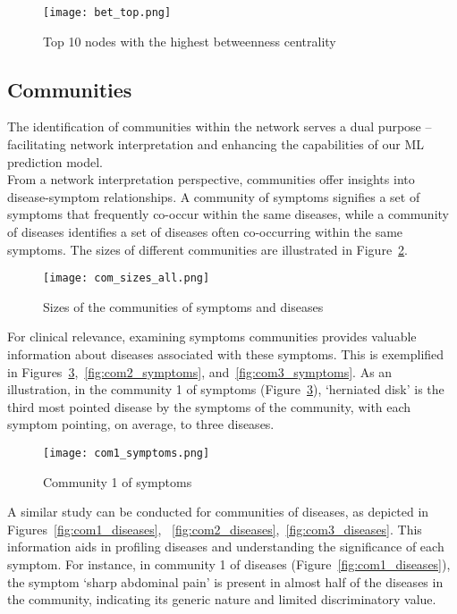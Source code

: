 \begin{figure}[H]
    \centering
    \texttt{[image: bet\_top.png]}
    \caption{Top 10 nodes with the highest betweenness centrality}
    \label{fig:bet_top}
\end{figure}
\noindent

\subsection{Communities}

The identification of communities within the network serves a dual purpose – facilitating network interpretation
and enhancing the capabilities of our ML prediction model.\\
From a network interpretation perspective, communities offer insights into disease-symptom relationships.
A community of symptoms signifies a set of symptoms that frequently co-occur within the same diseases, while a
community of diseases identifies a set of diseases often co-occurring within the same symptoms. The sizes of
different communities are illustrated in Figure~\ref{fig:com_sizes_all}.

\begin{figure}[H]
    \centering
    \texttt{[image: com\_sizes\_all.png]}
    \caption{Sizes of the communities of symptoms and diseases}
    \label{fig:com_sizes_all}
\end{figure}
\noindent
For clinical relevance, examining symptoms communities provides valuable information about diseases associated
with these symptoms. This is exemplified in Figures~\ref{fig:com1_symptoms},~\ref{fig:com2_symptoms},
and~\ref{fig:com3_symptoms}. As an illustration, in the community 1 of symptoms (Figure~\ref{fig:com1_symptoms}),
`herniated disk' is the third most pointed disease by the symptoms of the community, with each symptom pointing,
on average, to three diseases.

\begin{figure}[H]
    \centering
    \texttt{[image: com1\_symptoms.png]}
    \caption{Community 1 of symptoms}
    \label{fig:com1_symptoms}
\end{figure}
\noindent
A similar study can be conducted for communities of diseases, as depicted in Figures~\ref{fig:com1_diseases},
~\ref{fig:com2_diseases},~\ref{fig:com3_diseases}. This information aids in profiling diseases and understanding
the significance of each symptom. For instance, in community 1 of diseases (Figure~\ref{fig:com1_diseases}),
the symptom `sharp abdominal pain' is present in almost half of the diseases in the community, indicating its
generic nature and limited discriminatory value.

